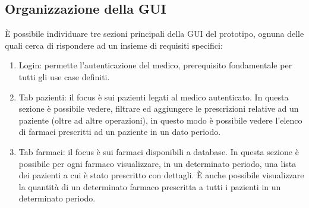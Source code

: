 \documentclass[a4paper, 11pt]{article}
\begin{document}
\subsection{Organizzazione della GUI}
È possibile individuare tre sezioni principali della GUI del prototipo, ognuna delle quali cerca di rispondere ad un insieme di requisiti specifici:
\begin{enumerate}[label=(\alph*)., nosep]
	\item Login: permette l'autenticazione del medico, prerequisito fondamentale per tutti gli use case definiti. 
	\item Tab pazienti: il focus è sui pazienti legati al medico autenticato. In questa sezione è possibile vedere, filtrare ed aggiungere le prescrizioni relative ad un paziente (oltre ad altre operazioni), in questo modo è possibile vedere l'elenco di farmaci prescritti ad un paziente in un dato periodo.
	\item Tab farmaci: il focus è sui farmaci disponibili a database. In questa sezione è possibile per ogni farmaco visualizzare, in un determinato periodo, una lista dei pazienti a cui è stato prescritto con dettagli. È anche possibile visualizzare la quantità di un determinato farmaco prescritta a tutti i pazienti in un determinato periodo. 
\end{enumerate}
\end{document}

